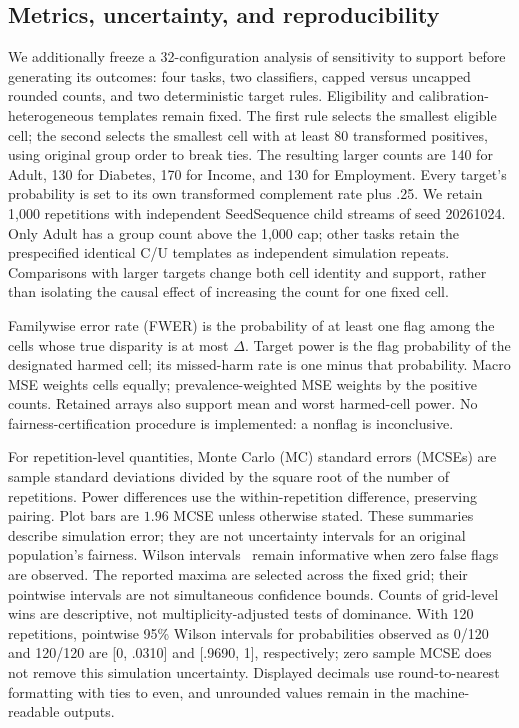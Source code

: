 \documentclass[Afour,sageh,times,doublespace]{sagej}
\begin{document}
\subsection{Metrics, uncertainty, and reproducibility}
We additionally freeze a 32-configuration analysis of sensitivity to support before generating its outcomes: four tasks, two classifiers, capped versus uncapped rounded counts, and two deterministic target rules. Eligibility and calibration-heterogeneous templates remain fixed. The first rule selects the smallest eligible cell; the second selects the smallest cell with at least 80 transformed positives, using original group order to break ties. The resulting larger counts are 140 for Adult, 130 for Diabetes, 170 for Income, and 130 for Employment. Every target's probability is set to its own transformed complement rate plus .25. We retain 1,000 repetitions with independent SeedSequence child streams of seed 20261024. Only Adult has a group count above the 1,000 cap; other tasks retain the prespecified identical C/U templates as independent simulation repeats. Comparisons with larger targets change both cell identity and support, rather than isolating the causal effect of increasing the count for one fixed cell.

Familywise error rate (FWER) is the probability of at least one flag among the cells whose true disparity is at most $\Delta$. Target power is the flag probability of the designated harmed cell; its missed-harm rate is one minus that probability. Macro MSE weights cells equally; prevalence-weighted MSE weights by the positive counts. Retained arrays also support mean and worst harmed-cell power. No fairness-certification procedure is implemented: a nonflag is inconclusive.

For repetition-level quantities, Monte Carlo (MC) standard errors (MCSEs) are sample standard deviations divided by the square root of the number of repetitions. Power differences use the within-repetition difference, preserving pairing. Plot bars are $1.96$ MCSE unless otherwise stated. These summaries describe simulation error; they are not uncertainty intervals for an original population's fairness. Wilson intervals~\citep{wilson1927probable} remain informative when zero false flags are observed. The reported maxima are selected across the fixed grid; their pointwise intervals are not simultaneous confidence bounds. Counts of grid-level wins are descriptive, not multiplicity-adjusted tests of dominance. With 120 repetitions, pointwise 95\% Wilson intervals for probabilities observed as 0/120 and 120/120 are [0, .0310] and [.9690, 1], respectively; zero sample MCSE does not remove this simulation uncertainty. Displayed decimals use round-to-nearest formatting with ties to even, and unrounded values remain in the machine-readable outputs.
\end{document}

